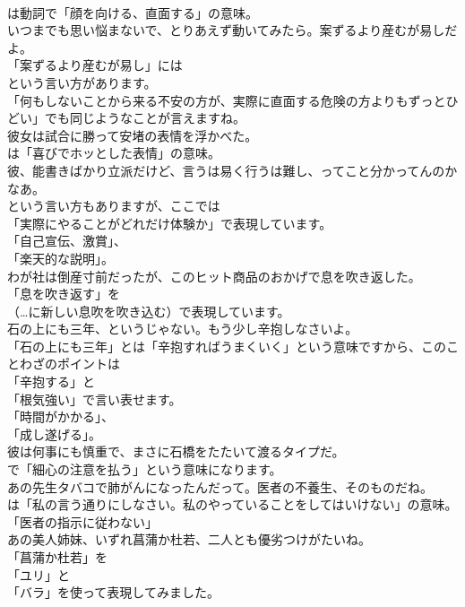 \documentclass[8pt]{extreport}
\begin{document}
\begin{CJK}{UTF8}{min}
\\	は動詞で「顔を向ける、直面する」の意味。	
\\	いつまでも思い悩まないで、とりあえず動いてみたら。案ずるより産むが易しだよ。 
\\	「案ずるより産むが易し」には
\\	という言い方があります。
\\	「何もしないことから来る不安の方が、実際に直面する危険の方よりもずっとひどい」でも同じようなことが言えますね。	
\\	彼女は試合に勝って安堵の表情を浮かべた。 
\\	は「喜びでホッとした表情」の意味。	
\\	彼、能書きばかり立派だけど、言うは易く行うは難し、ってこと分かってんのかなあ。 
\\	という言い方もありますが、ここでは
\\	「実際にやることがどれだけ体験か」で表現しています。
\\	「自己宣伝、激賞」、
\\	「楽天的な説明」。	
\\	わが社は倒産寸前だったが、このヒット商品のおかげで息を吹き返した。 
\\	「息を吹き返す」を 
\\	（…に新しい息吹を吹き込む）で表現しています。	
\\	石の上にも三年、というじゃない。もう少し辛抱しなさいよ。 
\\	「石の上にも三年」とは「辛抱すればうまくいく」という意味ですから、このことわざのポイントは
\\	「辛抱する」と
\\	「根気強い」で言い表せます。
\\	「時間がかかる」、
\\	「成し遂げる」。	
\\	彼は何事にも慎重で、まさに石橋をたたいて渡るタイプだ。 
\\	で「細心の注意を払う」という意味になります。	
\\	あの先生タバコで肺がんになったんだって。医者の不養生、そのものだね。 
\\	は「私の言う通りにしなさい。私のやっていることをしてはいけない」の意味。
\\	「医者の指示に従わない」	
\\	あの美人姉妹、いずれ菖蒲か杜若、二人とも優劣つけがたいね。 
\\	「菖蒲か杜若」を
\\	「ユリ」と
\\	「バラ」を使って表現してみました。

\end{CJK}
\end{document}
